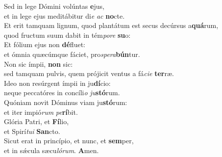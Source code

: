 \evenverse Sed in lege Dómini volúntas \textbf{e}jus,~\*\\
\evenverse et in lege ejus meditábitur di\textit{e} \textit{ac} \textbf{no}cte.\\
\oddverse Et erit tamquam lignum, quod plantátum est secus decúrsus a\textbf{quá}rum,~\*\\
\oddverse quod fructum suum dabit in tém\textit{po}\textit{re} \textbf{su}o:\\
\evenverse Et fólium ejus non \textbf{dé}fluet:~\*\\
\evenverse et ómnia quæcúmque fáciet, pro\textit{spe}\textit{ra}\textbf{bún}tur.\\
\oddverse Non sic ímpii, \textbf{non} sic:~\*\\
\oddverse sed tamquam pulvis, quem prójicit ventus a fá\textit{ci}\textit{e} \textbf{ter}ræ.\\
\evenverse Ideo non resúrgent ímpii in ju\textbf{dí}cio:~\*\\
\evenverse neque peccatóres in concíli\textit{o} \textit{ju}\textbf{stó}rum.\\
\oddverse Quóniam novit Dóminus viam ju\textbf{stó}rum:~\*\\
\oddverse et iter impió\textit{rum} \textit{pe}\textbf{rí}bit.\\
\evenverse Glória Patri, et \textbf{Fí}lio,~\*\\
\evenverse et Spirí\textit{tu}\textit{i} \textbf{San}cto.\\
\oddverse Sicut erat in princípio, et nunc, et \textbf{sem}per,~\*\\
\oddverse et in sǽcula sæcu\textit{ló}\textit{rum}. \textbf{A}men.\\
